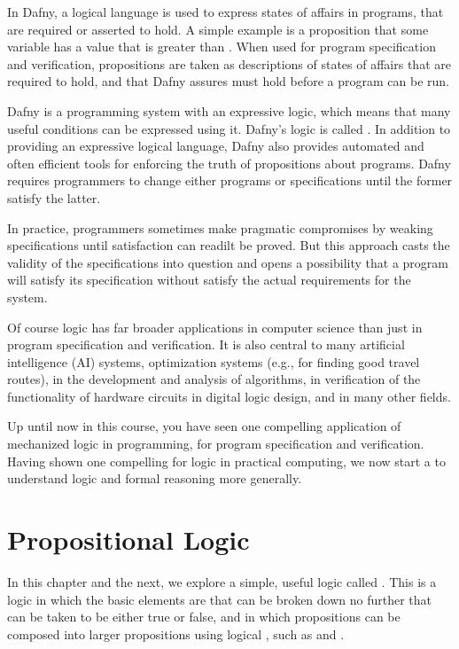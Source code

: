 \documentclass[letterpaper,10pt,english]{sphinxmanual}
\begin{document}
In Dafny, a logical language is used to express states of affairs in
programs, that are required or asserted to hold. A simple example is a
proposition that some variable has a value that is greater than .
When used for program specification and verification, propositions are
taken as descriptions of states of affairs that are required to hold,
and that Dafny assures must hold before a program can be run.

Dafny is a programming system with an expressive logic, which means
that many useful conditions can be expressed using it. Dafny’s logic
is called . In addition to providing an expressive
logical language, Dafny also provides automated and often efficient
tools for enforcing the truth of propositions about programs. Dafny
requires programmers to change either programs or specifications until
the former satisfy the latter.

In practice, programmers sometimes make pragmatic compromises by
weaking specifications until satisfaction can readilt be proved.  But
this approach casts the validity of the specifications into question
and opens a possibility that a program will satisfy its specification
without satisfy the actual requirements for the system.

Of course logic has far broader applications in computer science than
just in program specification and verification. It is also central to
many artificial intelligence (AI) systems, optimization systems (e.g.,
for finding good travel routes), in the development and analysis of
algorithms, in verification of the functionality of hardware circuits
in digital logic design, and in many other fields.

Up until now in this course, you have seen one compelling application
of mechanized logic in programming, for program specification and
verification. Having shown one compelling  for logic in
practical computing, we now start a  to understand logic
and formal reasoning more generally.


\section{Propositional Logic}
\label{\detokenize{09-propositional-logic:id1}}
In this chapter and the next, we explore a simple, useful logic called
. This is a logic in which the basic elements are
\textendash{}that can be broken down no further\textendash{} that can
be taken to be either true or false, and in which propositions can be
composed into larger propositions using logical , such as
 and .
\end{document}
